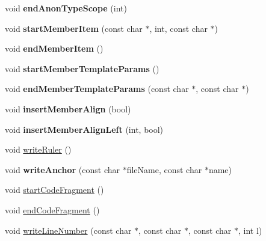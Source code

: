 \begin{DoxyCompactItemize}
\mbox{\label{class_r_t_f_generator_a99b1d699a7530ecb1542c9a76bc60cb0}} 
void {\bfseries end\+Anon\+Type\+Scope} (int)
\item 
\mbox{\label{class_r_t_f_generator_ad148e67bb61bb3c7dd7392e7a2786353}} 
void {\bfseries start\+Member\+Item} (const char $\ast$, int, const char $\ast$)
\item 
\mbox{\label{class_r_t_f_generator_adfbb9b8fb310181f9c66383d6ebe84b7}} 
void {\bfseries end\+Member\+Item} ()
\item 
\mbox{\label{class_r_t_f_generator_a61df52cef3429c7db462e28a3f39937c}} 
void {\bfseries start\+Member\+Template\+Params} ()
\item 
\mbox{\label{class_r_t_f_generator_a6b09bc398bb77e562c3847c94ef1d663}} 
void {\bfseries end\+Member\+Template\+Params} (const char $\ast$, const char $\ast$)
\item 
\mbox{\label{class_r_t_f_generator_aeae50b322d39c2db900f5bc883cb4519}} 
void {\bfseries insert\+Member\+Align} (bool)
\item 
\mbox{\label{class_r_t_f_generator_ab64913ff195ea9b55f48f22d43b00a28}} 
void {\bfseries insert\+Member\+Align\+Left} (int, bool)
\item 
void \mbox{\hyperlink{class_r_t_f_generator_a97d0c2260e0642d5b6ac0117b2e91687}{write\+Ruler}} ()
\item 
\mbox{\label{class_r_t_f_generator_a425368bac3a2fb414b747ae60a1e2301}} 
void {\bfseries write\+Anchor} (const char $\ast$file\+Name, const char $\ast$name)
\item 
void \mbox{\hyperlink{class_r_t_f_generator_ac7783a014fb21a8688b4f334aea2cc30}{start\+Code\+Fragment}} ()
\item 
void \mbox{\hyperlink{class_r_t_f_generator_ae75111adf81a1179b924ab7656d8c74c}{end\+Code\+Fragment}} ()
\item 
void \mbox{\hyperlink{class_r_t_f_generator_a4e6a13e14340ff6585c305d3c9b55c4f}{write\+Line\+Number}} (const char $\ast$, const char $\ast$, const char $\ast$, int l)

\end{DoxyCompactItemize}
